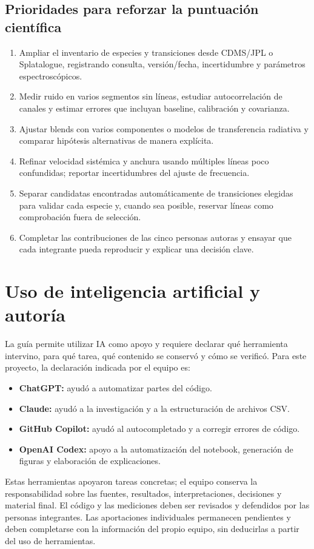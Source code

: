 \documentclass[10pt]{article}
\begin{document}
\subsection{Prioridades para reforzar la puntuación científica}
\begin{enumerate}
  \item Ampliar el inventario de especies y transiciones desde CDMS/JPL o Splatalogue, registrando consulta, versión/fecha, incertidumbre y parámetros espectroscópicos.
  \item Medir ruido en varios segmentos sin líneas, estudiar autocorrelación de canales y estimar errores que incluyan baseline, calibración y covarianza.
  \item Ajustar blends con varios componentes o modelos de transferencia radiativa y comparar hipótesis alternativas de manera explícita.
  \item Refinar velocidad sistémica y anchura usando múltiples líneas poco confundidas; reportar incertidumbres del ajuste de frecuencia.
  \item Separar candidatas encontradas automáticamente de transiciones elegidas para validar cada especie y, cuando sea posible, reservar líneas como comprobación fuera de selección.
  \item Completar las contribuciones de las cinco personas autoras y ensayar que cada integrante pueda reproducir y explicar una decisión clave.
\end{enumerate}

\section{Uso de inteligencia artificial y autoría}
La guía permite utilizar IA como apoyo y requiere declarar qué herramienta intervino, para qué tarea, qué contenido se conservó y cómo se verificó. Para este proyecto, la declaración indicada por el equipo es:
\begin{itemize}
  \item \textbf{ChatGPT:} ayudó a automatizar partes del código.
  \item \textbf{Claude:} ayudó a la investigación y a la estructuración de archivos CSV.
  \item \textbf{GitHub Copilot:} ayudó al autocompletado y a corregir errores de código.
  \item \textbf{OpenAI Codex:} apoyo a la automatización del notebook, generación de figuras y elaboración de explicaciones.
\end{itemize}
Estas herramientas apoyaron tareas concretas; el equipo conserva la responsabilidad sobre las fuentes, resultados, interpretaciones, decisiones y material final. El código y las mediciones deben ser revisados y defendidos por las personas integrantes. Las aportaciones individuales permanecen pendientes y deben completarse con la información del propio equipo, sin deducirlas a partir del uso de herramientas.
\end{document}
